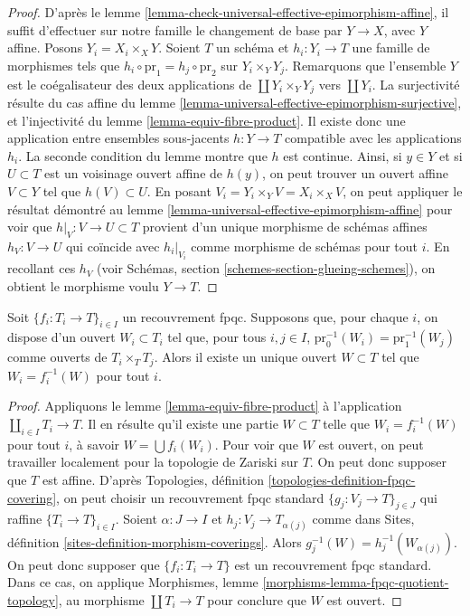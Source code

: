 \begin{proof}
D'après le lemme \ref{lemma-check-universal-effective-epimorphism-affine},
il suffit d'effectuer sur notre famille le changement de base par
$Y \to X$, avec $Y$ affine. Posons $Y_i = X_i \times_X Y$.
Soient $T$ un schéma et $h_i : Y_i \to T$ une famille de morphismes tels que
$h_i \circ \text{pr}_1 = h_j \circ \text{pr}_2$ sur $Y_i \times_Y Y_j$.
Remarquons que l'ensemble $Y$ est le coégalisateur des deux applications de
$\coprod Y_i \times_Y Y_j$ vers $\coprod Y_i$.
La surjectivité résulte du cas affine du lemme
\ref{lemma-universal-effective-epimorphism-surjective}, et l'injectivité du
lemme \ref{lemma-equiv-fibre-product}.
Il existe donc une application entre ensembles sous-jacents $h : Y \to T$
compatible avec les applications $h_i$. La seconde condition du lemme montre
que $h$ est continue. Ainsi, si $y \in Y$ et si $U \subset T$ est un voisinage
ouvert affine de $h(y)$, on peut trouver un ouvert affine $V \subset Y$ tel que
$h(V) \subset U$.
En posant $V_i = Y_i \times_Y V = X_i \times_X V$, on peut appliquer le
résultat démontré au lemme
\ref{lemma-universal-effective-epimorphism-affine} pour voir que
$h|_V : V \to U \subset T$ provient d'un unique morphisme de schémas affines
$h_V : V \to U$ qui coïncide avec $h_i|_{V_i}$ comme morphisme de schémas pour
tout $i$. En recollant ces $h_V$
(voir Schémas, section \ref{schemes-section-glueing-schemes}), on obtient le
morphisme voulu $Y \to T$.
\end{proof}

\begin{lemma}
\label{lemma-open-fpqc-covering}
Soit $\{f_i : T_i \to T\}_{i \in I}$ un recouvrement fpqc.
Supposons que, pour chaque $i$, on dispose d'un ouvert $W_i \subset T_i$ tel
que, pour tous $i, j \in I$,
$\text{pr}_0^{-1}(W_i) = \text{pr}_1^{-1}(W_j)$ comme ouverts de
$T_i \times_T T_j$. Alors il existe un unique ouvert $W \subset T$ tel que
$W_i = f_i^{-1}(W)$ pour tout $i$.
\end{lemma}

\begin{proof}
Appliquons le lemme \ref{lemma-equiv-fibre-product} à l'application
$\coprod_{i \in I} T_i \to T$.
Il en résulte qu'il existe une partie $W \subset T$ telle que
$W_i = f_i^{-1}(W)$ pour tout $i$, à savoir $W = \bigcup f_i(W_i)$.
Pour voir que $W$ est ouvert, on peut travailler localement pour la topologie
de Zariski sur $T$. On peut donc supposer que $T$ est affine.
D'après Topologies, définition
\ref{topologies-definition-fpqc-covering}, on peut choisir un recouvrement
fpqc standard $\{g_j : V_j \to T\}_{j \in J}$ qui raffine
$\{T_i \to T\}_{i \in I}$. Soient $\alpha : J \to I$ et
$h_j : V_j \to T_{\alpha(j)}$ comme dans Sites, définition
\ref{sites-definition-morphism-coverings}.
Alors $g_j^{-1}(W) = h_j^{-1}(W_{\alpha(j)})$.
On peut donc supposer que $\{f_i : T_i \to T\}$ est un recouvrement fpqc
standard. Dans ce cas, on applique Morphismes, lemme
\ref{morphisms-lemma-fpqc-quotient-topology}, au morphisme
$\coprod T_i \to T$ pour conclure que $W$ est ouvert.
\end{proof}

